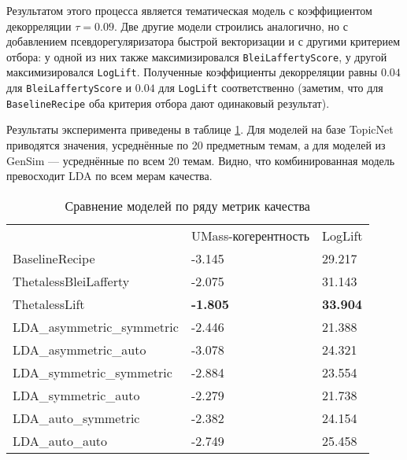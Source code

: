 Результатом этого процесса является тематическая модель с коэффициентом декорреляции $\tau=0.09$. Две другие модели строились аналогично, но с добавлением псевдорегуляризатора быстрой векторизации и с другими критерием отбора: у одной из них также максимизировался \texttt{BleiLaffertyScore}, у другой максимизировался \texttt{LogLift}. Полученные коэффициенты декорреляции равны $0.04$ для \texttt{BleiLaffertyScore} и $0.04$ для \texttt{LogLift} соответственно (заметим, что для \texttt{BaselineRecipe} оба критерия отбора дают одинаковый результат).  

Результаты эксперимента приведены в таблице \ref{tab:better_baseline}. Для моделей на базе TopicNet приводятся значения, усреднённые по 20 предметным темам, а для моделей из GenSim --- усреднённые по всем 20 темам. Видно, что комбинированная модель превосходит LDA по всем мерам качества.  

\begin{table}[]
\begin{tabular}{lll}
                         & UMass-когерентность & LogLift             \\
BaselineRecipe           & -3.145         & 29.217         \\
ThetalessBleiLafferty   & -2.075         & 31.143           \\
ThetalessLift           & \textbf{-1.805}  & \textbf{33.904} \\
LDA\_asymmetric\_symmetric & -2.446          & 21.388           \\
LDA\_asymmetric\_auto      & -3.078          & 24.321          \\
LDA\_symmetric\_symmetric  & -2.884          & 23.554         \\
LDA\_symmetric\_auto       & -2.279         & 21.738          \\
LDA\_auto\_symmetric       & -2.382           & 24.154          \\
LDA\_auto\_auto            & -2.749          & 25.458
\end{tabular}
\label{tab:better_baseline}
\caption{Сравнение моделей по ряду метрик качества}
\end{table} 



